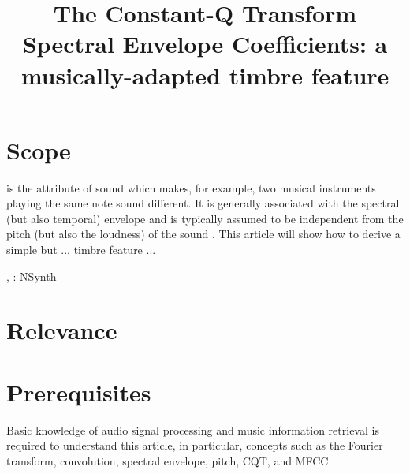 \documentclass[journal]{IEEEtran}
\begin{document}
\title{The Constant-Q Transform Spectral Envelope Coefficients: a musically-adapted timbre feature}

\maketitle


\section{Scope}



 is the attribute of sound which makes, for example, two musical instruments playing the same note sound different. It is generally associated with the spectral (but also temporal) envelope and is typically assumed to be independent from the pitch (but also the loudness) of the sound \cite{moore2004}. This article will show how to derive a simple but ... timbre feature ...

\cite{brown1991}, \cite{brown1992}
\cite{engel2017}: NSynth


\section{Relevance}



\section{Prerequisites}

Basic knowledge of audio signal processing and music information retrieval is required to understand this article, in particular, concepts such as the Fourier transform, convolution, spectral envelope, pitch, CQT, and MFCC.
\end{document}
